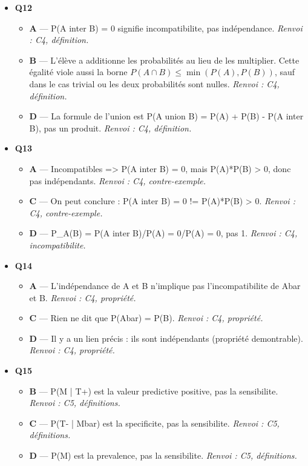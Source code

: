\begin{itemize}
\begin{itemize}
  \end{itemize}
  \item \textbf{Q12}
  \begin{itemize}
    \item \textbf{A} — P(A inter B) = 0 signifie incompatibilite, pas indépendance. \emph{Renvoi : C4, définition.}
    \item \textbf{B} — L'élève a additionne les probabilités au lieu de les multiplier. Cette égalité viole aussi la borne $P(A\cap B)\leqslant \min(P(A),P(B))$, sauf dans le cas trivial ou les deux probabilités sont nulles. \emph{Renvoi : C4, définition.}
    \item \textbf{D} — La formule de l'union est P(A union B) = P(A) + P(B) - P(A inter B), pas un produit. \emph{Renvoi : C4, définition.}
  \end{itemize}
  \item \textbf{Q13}
  \begin{itemize}
    \item \textbf{A} — Incompatibles => P(A inter B) = 0, mais P(A)*P(B) > 0, donc pas indépendants. \emph{Renvoi : C4, contre-exemple.}
    \item \textbf{C} — On peut conclure : P(A inter B) = 0 != P(A)*P(B) > 0. \emph{Renvoi : C4, contre-exemple.}
    \item \textbf{D} — P\_A(B) = P(A inter B)/P(A) = 0/P(A) = 0, pas 1. \emph{Renvoi : C4, incompatibilite.}
  \end{itemize}
  \item \textbf{Q14}
  \begin{itemize}
    \item \textbf{A} — L'indépendance de A et B n'implique pas l'incompatibilite de Abar et B. \emph{Renvoi : C4, propriété.}
    \item \textbf{C} — Rien ne dit que P(Abar) = P(B). \emph{Renvoi : C4, propriété.}
    \item \textbf{D} — Il y a un lien précis : ils sont indépendants (propriété demontrable). \emph{Renvoi : C4, propriété.}
  \end{itemize}
  \item \textbf{Q15}
  \begin{itemize}
    \item \textbf{B} — P(M | T+) est la valeur predictive positive, pas la sensibilite. \emph{Renvoi : C5, définitions.}
    \item \textbf{C} — P(T- | Mbar) est la specificite, pas la sensibilite. \emph{Renvoi : C5, définitions.}
    \item \textbf{D} — P(M) est la prevalence, pas la sensibilite. \emph{Renvoi : C5, définitions.}

\end{itemize}
\end{itemize}
